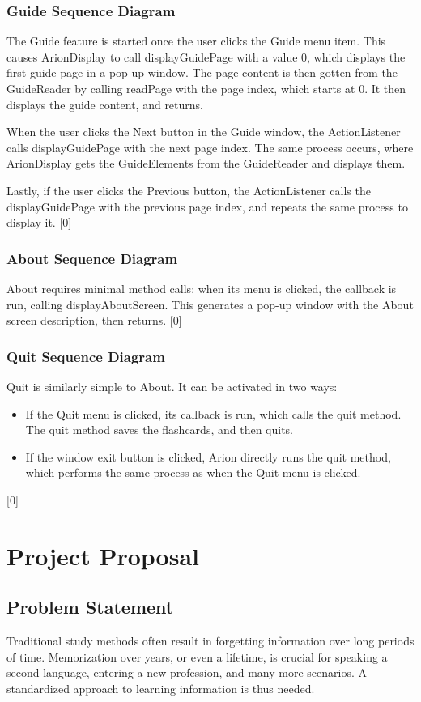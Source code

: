 \documentclass{scrreprt}
\begin{document}
\subsubsection*{Guide Sequence Diagram}
The Guide feature is started once the user clicks the Guide menu item.
This causes ArionDisplay to call displayGuidePage with a value 0, which displays the first guide page in a pop-up window.
The page content is then gotten from the GuideReader by calling readPage with the page index, which starts at 0.
It then displays the guide content, and returns.

When the user clicks the Next button in the Guide window, the ActionListener calls displayGuidePage with the next page index.
The same process occurs, where ArionDisplay gets the GuideElements from the GuideReader and displays them.

Lastly, if the user clicks the Previous button, the ActionListener calls the displayGuidePage with the previous page index,
and repeats the same process to display it.
[0]

\subsubsection*{About Sequence Diagram}
About requires minimal method calls: when its menu is clicked, the callback is run, calling displayAboutScreen.
This generates a pop-up window with the About screen description, then returns.
[0]

\subsubsection*{Quit Sequence Diagram}
Quit is similarly simple to About. It can be activated in two ways:
\begin{itemize}
    \item If the Quit menu is clicked, its callback is run, which calls the quit method.
        The quit method saves the flashcards, and then quits.
    \item If the window exit button is clicked, Arion directly runs the quit method, which performs the same process as when the Quit menu is clicked.
\end{itemize}
[0]

\section{Project Proposal}

\subsection{Problem Statement}
Traditional study methods often result in forgetting information over long periods of time.
Memorization over years, or even a lifetime, is crucial for
speaking a second language, entering a new profession, and many more scenarios.
A standardized approach to learning information is thus needed.
\end{document}
